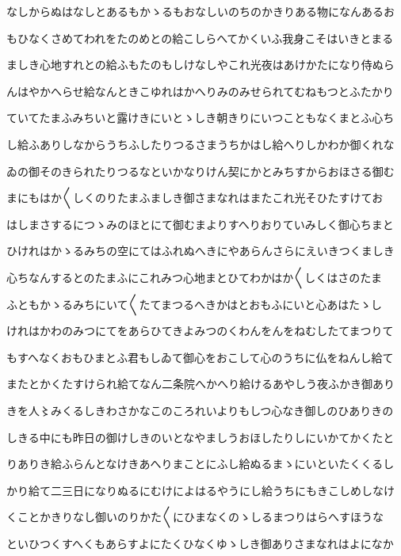 \documentclass[a4paper,11pt,landscape]{ltjtarticle}
\begin{document}
\par\medskip
なしからぬはなしとあるもかゝるもおなしいのちのかきりある物になんあるお
\par\medskip
もひなくさめてわれをたのめとの給こしらへてかくいふ我身こそはいきとまる
\par\medskip
ましき心地すれとの給ふもたのもしけなしやこれ光夜はあけかたになり侍ぬら
\par\medskip
んはやかへらせ給なんときこゆれはかへりみのみせられてむねもつとふたかり
\par\medskip
ていてたまふみちいと露けきにいとゝしき朝きりにいつこともなくまとふ心ち
\par\medskip
し給ふありしなからうちふしたりつるさまうちかはし給へりしかわか御くれな
\par\medskip
ゐの御そのきられたりつるなといかなりけん契にかとみちすからおほさる御む
\par\medskip
まにもはか〱しくのりたまふましき御さまなれはまたこれ光そひたすけてお
\par\medskip
はしまさするにつゝみのほとにて御むまよりすへりおりていみしく御心ちまと
\par\medskip
ひけれはかゝるみちの空にてはふれぬへきにやあらんさらにえいきつくましき
\par\medskip
心ちなんするとのたまふにこれみつ心地まとひてわかはか〱しくはさのたま
\par\medskip
ふともかゝるみちにいて〱たてまつるへきかはとおもふにいと心あはたゝし
\par\medskip
けれはかわのみつにてをあらひてきよみつのくわんをんをねむしたてまつりて
\par\medskip
もすへなくおもひまとふ君もしゐて御心をおこして心のうちに仏をねんし給て
\par\medskip
またとかくたすけられ給てなん二条院へかへり給けるあやしう夜ふかき御あり
\par\medskip
きを人〻みくるしきわさかなこのころれいよりもしつ心なき御しのひありきの
\par\medskip
しきる中にも昨日の御けしきのいとなやましうおほしたりしにいかてかくたと
\par\medskip
りありき給ふらんとなけきあへりまことにふし給ぬるまゝにいといたくくるし
\par\medskip
かり給て二三日になりぬるにむけによはるやうにし給うちにもきこしめしなけ
\par\medskip
くことかきりなし御いのりかた〱にひまなくのゝしるまつりはらへすほうな
\par\medskip
といひつくすへくもあらすよにたくひなくゆゝしき御ありさまなれはよになか
\par\medskip
\end{document}
